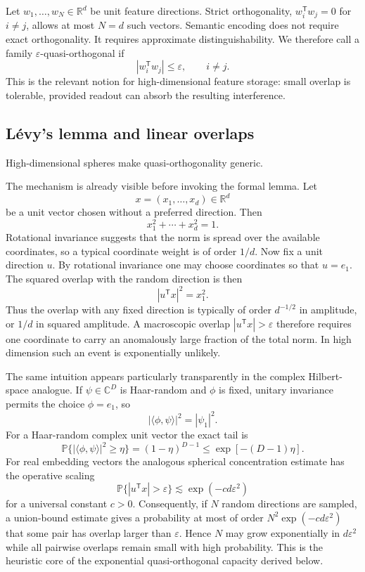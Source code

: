 \documentclass[
  aps,
  reprint,
  superscriptaddress,
  floatfix,
  nofootinbib,
  longbibliography
]{revtex4-2}
\newcommand{\R}{\mathbb{R}}
\newcommand{\Prob}{\mathbb{P}}
\newcommand{\T}{^{\mathsf{T}}}
\begin{document}
Let $w_{1},\dots,w_{N}\in\R^{d}$ be unit feature directions. Strict orthogonality,
$w_i\T w_j=0$ for $i\neq j$, allows at most $N=d$ such vectors. Semantic
encoding does not require exact orthogonality. It requires approximate
distinguishability. We therefore call a family
$\varepsilon$-quasi-orthogonal if
%
\begin{equation}
\label{eq:quasiortho}
|w_i\T w_j|\le \varepsilon,\qquad i\neq j .
\end{equation}
%
This is the relevant notion for high-dimensional feature storage:
small overlap is tolerable, provided readout can absorb the resulting
interference.

\subsection{L\'evy's lemma and linear overlaps}
\label{sec:levy}

High-dimensional spheres make quasi-orthogonality generic.

The mechanism is already visible before invoking the formal lemma.  Let
\[
        x=(x_1,\ldots,x_d)\in\R^d
\]
be a unit vector chosen without a preferred direction.  Then
\[
        x_1^2+\cdots+x_d^2=1 .
\]
Rotational invariance suggests that the norm is spread over the available
coordinates, so a typical coordinate weight is of order $1/d$.  Now fix a
unit direction $u$.  By rotational invariance one may choose coordinates so
that $u=e_1$.  The squared overlap with the random direction is then
\[
        |u\T x|^2=x_1^2 .
\]
Thus the overlap with any fixed direction is typically of order $d^{-1/2}$
in amplitude, or $1/d$ in squared amplitude.  A macroscopic overlap
$|u\T x|>\varepsilon$ therefore requires one coordinate to carry an
anomalously large fraction of the total norm.  In high dimension such an
event is exponentially unlikely.

The same intuition appears particularly transparently in the complex
Hilbert-space analogue.  If $\psi\in\mathbb{C}^D$ is Haar-random and
$\phi$ is fixed, unitary invariance permits the choice $\phi=e_1$, so
\[
        |\langle\phi,\psi\rangle|^2=|\psi_1|^2 .
\]
For a Haar-random complex unit vector the exact tail is
\[
        \Prob\{ |\langle\phi,\psi\rangle|^2\geq\eta\}
        =(1-\eta)^{D-1}
        \leq \exp[-(D-1)\eta] .
\]
For real embedding vectors the analogous spherical concentration estimate
has the operative scaling
\[
        \Prob\{ |u\T x|>\varepsilon\}
        \lesssim \exp(-c d\varepsilon^2)
\]
for a universal constant $c>0$.  Consequently, if $N$ random directions are
sampled, a union-bound estimate gives a probability at most of order
$N^2\exp(-c d\varepsilon^2)$ that some pair has overlap larger than
$\varepsilon$.  Hence $N$ may grow exponentially in $d\varepsilon^2$ while
all pairwise overlaps remain small with high probability.  This is the
heuristic core of the exponential quasi-orthogonal capacity derived below.
\end{document}
